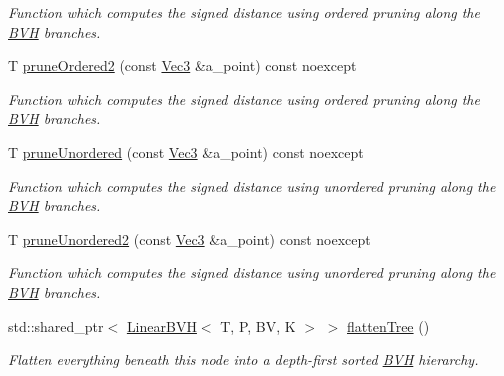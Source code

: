 \begin{DoxyCompactItemize}
\begin{DoxyCompactList}\small\item\em Function which computes the signed distance using ordered pruning along the \hyperlink{namespaceBVH}{B\+VH} branches. \end{DoxyCompactList}\item 
T \hyperlink{classBVH_1_1NodeT_acb7fec40e06e97fcd42ec75169603e8b}{prune\+Ordered2} (const \hyperlink{classBVH_1_1NodeT_a6fbb4308c5c55ee170c5f992df7ae1d0}{Vec3} \&a\+\_\+point) const noexcept
\begin{DoxyCompactList}\small\item\em Function which computes the signed distance using ordered pruning along the \hyperlink{namespaceBVH}{B\+VH} branches. \end{DoxyCompactList}\item 
T \hyperlink{classBVH_1_1NodeT_a27cfc030a9b7f9b0341e94dc6733b511}{prune\+Unordered} (const \hyperlink{classBVH_1_1NodeT_a6fbb4308c5c55ee170c5f992df7ae1d0}{Vec3} \&a\+\_\+point) const noexcept
\begin{DoxyCompactList}\small\item\em Function which computes the signed distance using unordered pruning along the \hyperlink{namespaceBVH}{B\+VH} branches. \end{DoxyCompactList}\item 
T \hyperlink{classBVH_1_1NodeT_aafa2f1f4f4f58296531723e9a6d7d13a}{prune\+Unordered2} (const \hyperlink{classBVH_1_1NodeT_a6fbb4308c5c55ee170c5f992df7ae1d0}{Vec3} \&a\+\_\+point) const noexcept
\begin{DoxyCompactList}\small\item\em Function which computes the signed distance using unordered pruning along the \hyperlink{namespaceBVH}{B\+VH} branches. \end{DoxyCompactList}\item 
std\+::shared\+\_\+ptr$<$ \hyperlink{classBVH_1_1LinearBVH}{Linear\+B\+VH}$<$ T, P, BV, K $>$ $>$ \hyperlink{classBVH_1_1NodeT_a926e3990022ab28821d3f51e5fead023}{flatten\+Tree} ()
\begin{DoxyCompactList}\small\item\em Flatten everything beneath this node into a depth-\/first sorted \hyperlink{namespaceBVH}{B\+VH} hierarchy. \end{DoxyCompactList}\end{DoxyCompactItemize}
